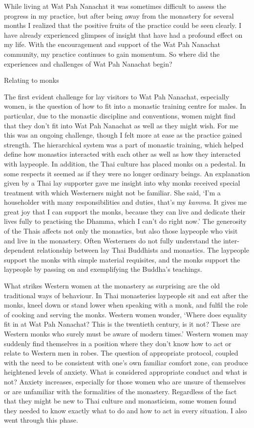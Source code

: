 While living at Wat Pah Nanachat it was sometimes difficult to assess
the progress in my practice, but after being away from the monastery for
several months I realized that the positive fruits of the practice could
be seen clearly. I have already experienced glimpses of insight that
have had a profound effect on my life. With the encouragement and
support of the Wat Pah Nanachat community, my practice continues to gain
momentum. So where did the experiences and challenges of Wat Pah
Nanachat begin? 

Relating to monks

The first evident challenge for lay visitors to Wat Pah Nanachat, 
especially women, is the question of how to fit into a monastic training
centre for males. In particular, due to the monastic discipline and
conventions, women might find that they don't fit into Wat Pah Nanachat
as well as they might wish. For me this was an ongoing challenge, though
I felt more at ease as the practice gained strength. The hierarchical
system was a part of monastic training, which helped define how
monastics interacted with each other as well as how they interacted with
laypeople. In addition, the Thai culture has placed monks on a pedestal. 
In some respects it seemed as if they were no longer ordinary beings. An
explanation given by a Thai lay supporter gave me insight into why monks
received special treatment with which Westerners might not be familiar. 
She said, `I'm a householder with many responsibilities and duties, 
that's my \emph{kamma}. It gives me great joy that I can support the
monks, because they can live and dedicate their lives fully to
practising the Dhamma, which I can't do right now.' The generosity of
the Thais affects not only the monastics, but also those laypeople who
visit and live in the monastery. Often Westerners do not fully
understand the inter-dependent relationship between lay Thai Buddhists
and monastics. The laypeople support the monks with simple material
requisites, and the monks support the laypeople by passing on and
exemplifying the Buddha's teachings. 

What strikes Western women at the monastery as surprising are the old
traditional ways of behaviour. In Thai monasteries laypeople sit and eat
after the monks, kneel down or stand lower when speaking with a monk, 
and fulfil the role of cooking and serving the monks. Western women
wonder, `Where does equality fit in at Wat Pah Nanachat? This is the
twentieth century, is it not? These are Western monks who surely must be
aware of modern times.' Western women may suddenly find themselves in a
position where they don't know how to act or relate to Western men in
robes. The question of appropriate protocol, coupled with the need to be
consistent with one's own familiar comfort zone, can produce heightened
levels of anxiety. What is considered appropriate conduct and what is
not? Anxiety increases, especially for those women who are unsure of
themselves or are unfamiliar with the formalities of the monastery. 
Regardless of the fact that they might be new to Thai culture and
monasticism, some women found they needed to know exactly what to do and
how to act in every situation. I also went through this phase. 

